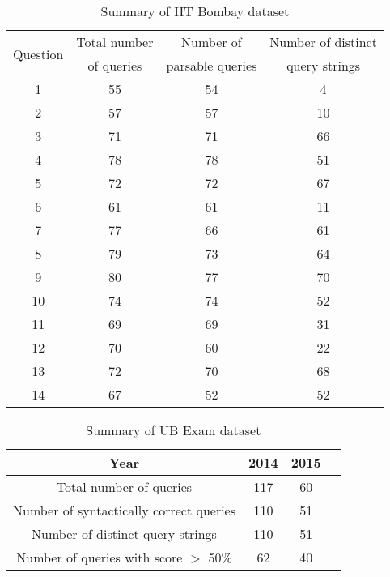 \begin{table}
\begin{center}
\begin{tabular}{ c c c c }
\toprule
	\multirow{2}{*}{Question} & Total number & Number of & Number of distinct\\
	& of queries & parsable queries &  query strings\\ \midrule
	1 & 55 & 54 & 4 \\ 
	2 & 57 & 57 & 10 \\ 
	3 & 71 & 71 & 66 \\ 
	4 & 78 & 78 & 51 \\ 
	5 & 72 & 72 & 67 \\ %
	6 & 61 & 61 & 11 \\ 
	7 & 77 & 66 & 61 \\ 
	8 & 79 & 73 & 64 \\ 
	9 & 80 & 77 & 70 \\ 
	10 & 74 & 74 & 52 \\ %
	11 & 69 & 69 & 31 \\ 
	12 & 70 & 60 & 22 \\ 
	13 & 72 & 70 & 68 \\ 
	14 & 67 & 52 & 52 \\ \bottomrule
\end{tabular}
\end{center}
\vspace{-3mm}
\caption{Summary of IIT Bombay dataset} 
\label{tab:xdata} 
\end{table}

\begin{table}
\begin{center}
\begin{tabular}{ c c c c}
\toprule
	Year & 2014 & 2015\\ \midrule
	Total number of queries & 117 & 60\\ 
	Number of syntactically correct queries & 110 & 51\\
	Number of distinct query strings & 110 & 51\\ 
	Number of queries with score $>$ 50\% & 62 & 40\\ 
	\bottomrule
\end{tabular}
\end{center}
\vspace{-3mm}
\caption{Summary of UB Exam dataset} 
\label{tab:ub_exam} 
\end{table}

